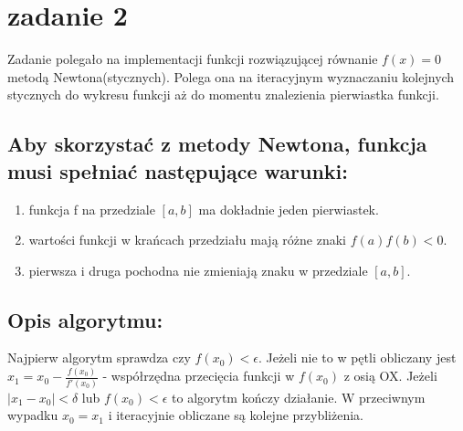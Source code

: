\section{zadanie 2}
Zadanie polegało na implementacji funkcji rozwiązującej równanie \(f(x) = 0\) metodą Newtona(stycznych). Polega ona na iteracyjnym wyznaczaniu kolejnych stycznych do wykresu funkcji aż do momentu znalezienia pierwiastka funkcji.

\subsection{Aby skorzystać z metody Newtona, funkcja musi spełniać następujące warunki: }
\begin{enumerate}
  \item funkcja f na przedziale \([a, b]\) ma dokładnie jeden pierwiastek.
  \item wartości funkcji w krańcach przedziału mają różne znaki \(f(a)f(b) < 0\).
  \item pierwsza i druga pochodna nie zmieniają znaku w przedziale \([a, b]\). 
\end{enumerate}

\subsection{Opis algorytmu: }
Najpierw algorytm sprawdza czy \(f(x_0) < \epsilon\). Jeżeli nie to w pętli obliczany jest \(x_1 = x_0 - \frac{f(x_0)}{f'(x_0)} \) - współrzędna przecięcia funkcji w \(f(x_0)\) z osią OX. Jeżeli \(|x_1 - x_0| < \delta\) lub \(f(x_0) < \epsilon\) to algorytm kończy działanie. W przeciwnym wypadku \(x_0 = x_1\) i iteracyjnie obliczane są kolejne przybliżenia.